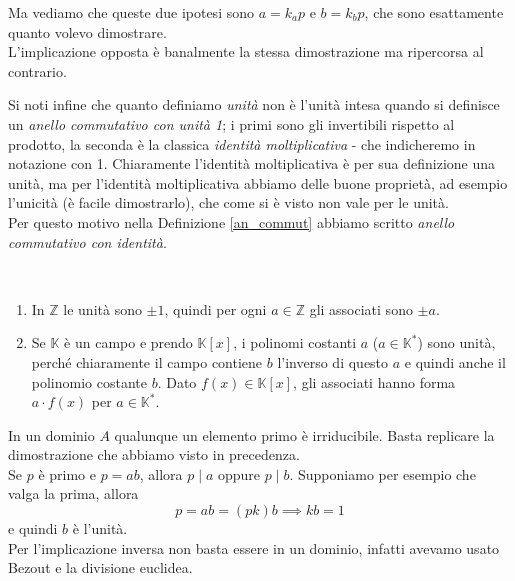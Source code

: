 \begin{osservazione}
\begin{enumerate}
		Ma vediamo che queste due ipotesi sono $a=k_ap$ e $b=k_bp$, che sono esattamente quanto volevo dimostrare. \\ L'implicazione opposta è banalmente la stessa dimostrazione ma ripercorsa al contrario.
	\end{enumerate}
	Si noti infine che quanto definiamo \textit{unità} non è l'unità intesa quando si definisce un \textit{anello commutativo con unità 1}; i primi sono gli invertibili rispetto al prodotto, la seconda è la classica \textit{identità moltiplicativa} - che indicheremo in notazione con 1. Chiaramente l'identità moltiplicativa è per sua definizione una unità, ma per l'identità moltiplicativa abbiamo delle buone proprietà, ad esempio l'unicità (è facile dimostrarlo), che come si è visto non vale per le unità. \\ Per questo motivo nella Definizione \ref{an_commut} abbiamo scritto \textit{anello commutativo con identità}.
\end{osservazione}
\begin{esempio}\
	\begin{enumerate}
		\item In $\mathbb{Z}$ le unità sono $\pm 1$, quindi per ogni $a \in \mathbb{Z}$ gli associati sono $\pm a$.
		\item Se $\mathbb{K}$ è un campo e prendo $\mathbb{K}[x]$, i polinomi costanti $a$ ($a \in \mathbb{K}^*$) sono unità, perché chiaramente il campo contiene $b$ l'inverso di questo $a$ e quindi anche il polinomio costante $b$. Dato $f(x) \in \mathbb{K}[x]$, gli associati hanno forma $a\cdot f(x)$ per $a \in \mathbb{K}^*$.
	\end{enumerate}
\end{esempio}
\begin{osservazione} 
	\label{notinD}
	In un dominio $A$ qualunque un elemento primo è irriducibile. Basta replicare la dimostrazione che abbiamo visto in precedenza.\\
	Se $p$ è primo e $p=ab$, allora $p\mid a$ oppure $p\mid b$. Supponiamo per esempio che valga la prima, allora 
	\begin{equation*}
	p=ab=(pk)b \implies kb=1 
	\end{equation*}
	e quindi $b$ è l'unità. \\ 
	Per l'implicazione inversa non basta essere in un dominio, infatti avevamo usato Bezout e la divisione euclidea.
\end{osservazione}
